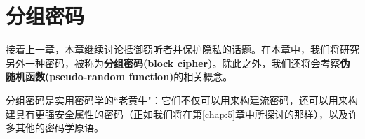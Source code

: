 \chapter{分组密码}\label{chap:4}

接着上一章，本章继续讨论抵御窃听者并保护隐私的话题。在本章中，我们将研究另外一种密码，被称为\textbf{分组密码(block cipher)}。除此之外，我们还将会考察\textbf{伪随机函数(pseudo-random function)}的相关概念。

分组密码是实用密码学的``老黄牛"：它们不仅可以用来构建流密码，还可以用来构建具有更强安全属性的密码（正如我们将在第\ref{chap:5}章中所探讨的那样），以及许多其他的密码学原语。











